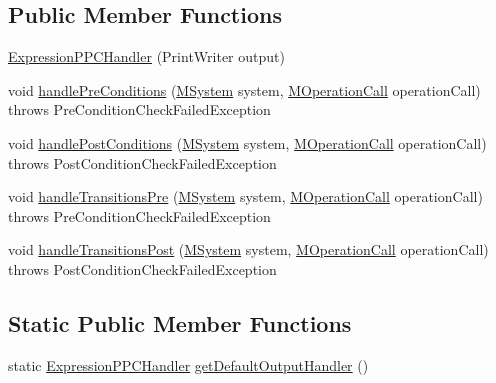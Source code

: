 \subsection*{Public Member Functions}
\begin{DoxyCompactItemize}
\item 
\hyperlink{classorg_1_1tzi_1_1use_1_1uml_1_1sys_1_1ppc_handling_1_1_expression_p_p_c_handler_a64f7057be34a2ca28175d219d2b44b78}{Expression\-P\-P\-C\-Handler} (Print\-Writer output)
\item 
void \hyperlink{classorg_1_1tzi_1_1use_1_1uml_1_1sys_1_1ppc_handling_1_1_expression_p_p_c_handler_a1f4e271f0f32ba327dbe22e152740374}{handle\-Pre\-Conditions} (\hyperlink{classorg_1_1tzi_1_1use_1_1uml_1_1sys_1_1_m_system}{M\-System} system, \hyperlink{classorg_1_1tzi_1_1use_1_1uml_1_1sys_1_1_m_operation_call}{M\-Operation\-Call} operation\-Call)  throws Pre\-Condition\-Check\-Failed\-Exception 
\item 
void \hyperlink{classorg_1_1tzi_1_1use_1_1uml_1_1sys_1_1ppc_handling_1_1_expression_p_p_c_handler_a3056d89ae6e26b7e1d25b1d8209b943b}{handle\-Post\-Conditions} (\hyperlink{classorg_1_1tzi_1_1use_1_1uml_1_1sys_1_1_m_system}{M\-System} system, \hyperlink{classorg_1_1tzi_1_1use_1_1uml_1_1sys_1_1_m_operation_call}{M\-Operation\-Call} operation\-Call)  throws Post\-Condition\-Check\-Failed\-Exception 
\item 
void \hyperlink{classorg_1_1tzi_1_1use_1_1uml_1_1sys_1_1ppc_handling_1_1_expression_p_p_c_handler_ab74ca661ff213373425778d3f38532b3}{handle\-Transitions\-Pre} (\hyperlink{classorg_1_1tzi_1_1use_1_1uml_1_1sys_1_1_m_system}{M\-System} system, \hyperlink{classorg_1_1tzi_1_1use_1_1uml_1_1sys_1_1_m_operation_call}{M\-Operation\-Call} operation\-Call)  throws Pre\-Condition\-Check\-Failed\-Exception 
\item 
void \hyperlink{classorg_1_1tzi_1_1use_1_1uml_1_1sys_1_1ppc_handling_1_1_expression_p_p_c_handler_a6522bef342e5d1a87a1909b00013bcb3}{handle\-Transitions\-Post} (\hyperlink{classorg_1_1tzi_1_1use_1_1uml_1_1sys_1_1_m_system}{M\-System} system, \hyperlink{classorg_1_1tzi_1_1use_1_1uml_1_1sys_1_1_m_operation_call}{M\-Operation\-Call} operation\-Call)  throws Post\-Condition\-Check\-Failed\-Exception 
\end{DoxyCompactItemize}
\subsection*{Static Public Member Functions}
\begin{DoxyCompactItemize}
\item 
static \hyperlink{classorg_1_1tzi_1_1use_1_1uml_1_1sys_1_1ppc_handling_1_1_expression_p_p_c_handler}{Expression\-P\-P\-C\-Handler} \hyperlink{classorg_1_1tzi_1_1use_1_1uml_1_1sys_1_1ppc_handling_1_1_expression_p_p_c_handler_aae3f63ae28666154a54afa66c2887cd7}{get\-Default\-Output\-Handler} ()
\end{DoxyCompactItemize}


